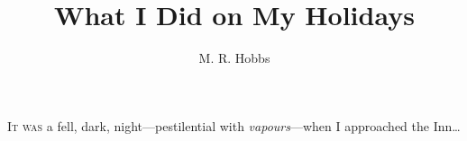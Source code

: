 \documentclass[letterpaper]{deedy-resume} %
\title{What I Did on My Holidays}
\author{M. R. Hobbs}
\begin{document}
\maketitle
\noindent \textsc{It was} a fell, dark, night---pestilential
with \textit{vapours}---when I approached the Inn\ldots
\end{document}
